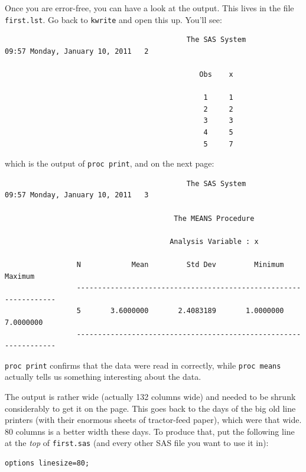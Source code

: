 \documentclass[11pt]{article}
\begin{document}
Once you are error-free, you can have a look at the output. This lives
in the file \texttt{first.lst}. Go back to \texttt{kwrite} and open
this up. You'll see:

\filbreak
{\footnotesize
\begin{verbatim}
                                           The SAS System         09:57 Monday, January 10, 2011   2

                                              Obs    x

                                               1     1
                                               2     2
                                               3     3
                                               4     5
                                               5     7
\end{verbatim}
}
\filbreak

which is the output of \verb-proc print-, and on the next page:

\filbreak
{\footnotesize
\begin{verbatim}
                                           The SAS System         09:57 Monday, January 10, 2011   3

                                        The MEANS Procedure

                                       Analysis Variable : x

                 N            Mean         Std Dev         Minimum         Maximum
                 -----------------------------------------------------------------
                 5       3.6000000       2.4083189       1.0000000       7.0000000
                 -----------------------------------------------------------------
\end{verbatim}
}
\filbreak

\verb-proc print- confirms that the data were read in correctly, while
\verb-proc means- actually tells us something interesting about the data.

The output is rather wide (actually 132 columns wide) and needed to be
shrunk considerably to get it on the page. This goes back to the days
of the big old line printers (with their enormous sheets of
tractor-feed paper), which were that wide. 80 columns is a better
width these days. To produce that, put the following line at the
\emph{top} of \texttt{first.sas} (and every other SAS file you want to
use it in):

\begin{verbatim}
options linesize=80;
\end{verbatim}
\end{document}
